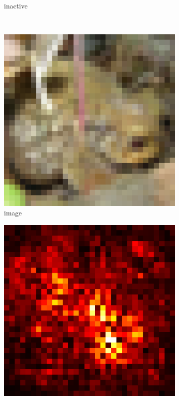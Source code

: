 \documentclass[preprint,12pt]{elsarticle}
\begin{document}
\begin{figure}
\begin{subfigure}{0.14\textwidth}
        \caption{inactive}
    \end{subfigure}\\
    \begin{subfigure}{0.14\linewidth}
        \centering
        \includegraphics[width=\linewidth]{../visualizations/examples/cifar10/cnn/images/6.png}
        \caption{image}
    \end{subfigure}
    \hfill
    \begin{subfigure}{0.14\linewidth}
        \centering
        \includegraphics[width=\linewidth]{../visualizations/examples/cifar10/cnn/saliency_map/6.png}

\end{subfigure}
\end{figure}
\end{document}
